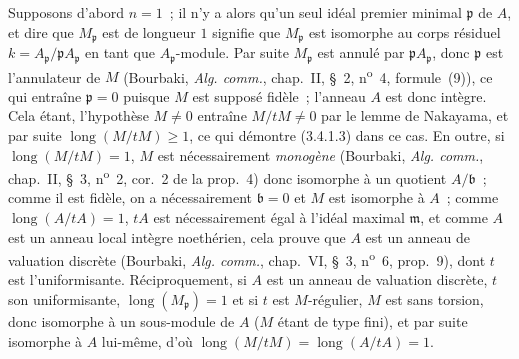 Supposons d'abord $n=1$~; il n'y a alors qu'un seul idéal premier minimal
$\mathfrak p$ de $A$,
et dire que $M_{\mathfrak p}$ est de longueur $1$
signifie que $M_{\mathfrak p}$ est isomorphe au corps résiduel
$k=A_{\mathfrak p}/\mathfrak pA_{\mathfrak p}$ en tant que
$A_{\mathfrak p}$-module. Par suite $M_{\mathfrak p}$ est annulé par
$\mathfrak pA_{\mathfrak p}$, donc $\mathfrak p$ est l'annulateur de $M$
(Bourbaki, \emph{Alg. comm.}, chap.~II, \S~2, n\textsuperscript{o}~4,
formule~(9)), ce qui entraîne $\mathfrak p=0$ puisque $M$ est supposé fidèle~;
l'anneau $A$ est donc intègre. Cela étant, l'hypothèse $M\neq0$ entraîne
$M/tM\neq0$ par le lemme de Nakayama, et par suite
$\operatorname{long}(M/tM)\geqslant1$, ce qui démontre (3.4.1.3) dans ce cas.
En outre, si $\operatorname{long}(M/tM)=1$, $M$ est nécessairement \emph{monogène}
(Bourbaki, \emph{Alg. comm.}, chap.~II, \S~3, n\textsuperscript{o}~2, cor.~2
de la prop.~4) donc isomorphe à un quotient $A/\mathfrak b$~; comme il est
fidèle, on a nécessairement $\mathfrak b=0$ et $M$ est isomorphe à $A$~;
comme $\operatorname{long}(A/tA)=1$, $tA$ est nécessairement égal à l'idéal
maximal $\mathfrak m$, et comme $A$ est un anneau local intègre noethérien,
cela prouve que $A$ est un anneau de valuation discrète (Bourbaki,
\emph{Alg. comm.}, chap.~VI, \S~3, n\textsuperscript{o}~6, prop.~9), dont $t$
est l'uniformisante. Réciproquement, si $A$ est un anneau de valuation
discrète, $t$ son uniformisante, $\operatorname{long}(M_{\mathfrak p})=1$ et
si $t$ est $M$-régulier, $M$ est sans torsion, donc isomorphe à un sous-module
de $A$ ($M$ étant de type fini), et par suite isomorphe à $A$ lui-même, d'où
$\operatorname{long}(M/tM)=\operatorname{long}(A/tA)=1$.

